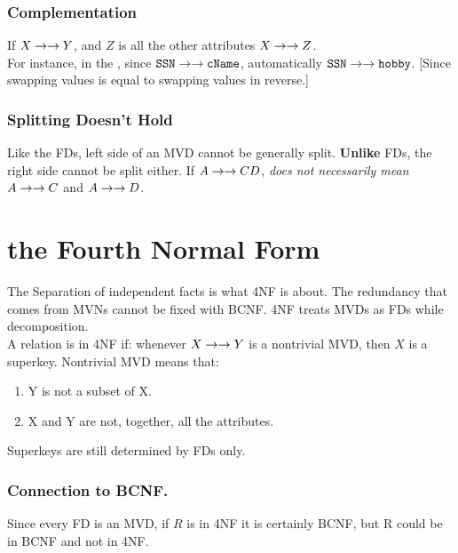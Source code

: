 \documentclass[11pt,a4paper,twocolumn]{book}
\begin{document}
\subsubsection{Complementation}

If $X \to\to Y$, and $Z$ is all the other attributes $X \to\to Z$.\\

For instance, in the \ApplyExample, since $\texttt{SSN} \to\to \texttt{cName}$, automatically $\texttt{SSN} \to\to \texttt{hobby}$. [Since swapping  values is equal to swapping  values in reverse.]

\subsubsection{Splitting Doesn't Hold}

Like the FDs, left side of an MVD cannot be generally split. \textbf{Unlike} FDs, the right side cannot be split either. If $A \to\to CD$, \textit{does not necessarily mean} $A \to\to C$ and $A \to\to D$.

\section{the Fourth Normal Form}

The Separation of independent facts is what 4NF is about. The redundancy that comes from MVNs cannot be fixed with BCNF. 4NF treats MVDs as FDs while decomposition.\\

A relation is in 4NF if: whenever $X \to\to Y$ is a nontrivial MVD, then $X$ is a superkey. Nontrivial MVD means that:

\begin{enumerate}
\item Y is not a subset of X.
\item X and Y are not, together, all the attributes.
\end{enumerate}

Superkeys are still determined by FDs only.\\

\subsubsection{Connection to BCNF.}

Since every FD is an MVD, if $R$ is in 4NF it is certainly BCNF, but R could be in BCNF and not in 4NF.\\
\end{document}
